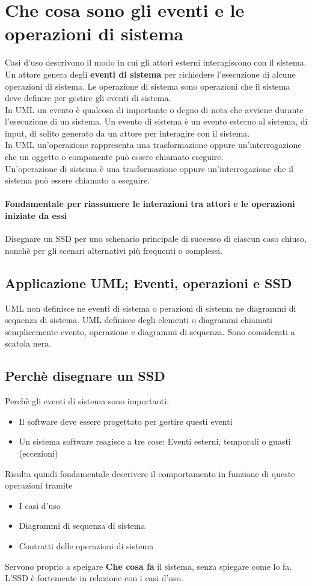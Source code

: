 \section{Che cosa sono gli eventi e le operazioni di sistema}
Casi d'uso descrivono il modo in cui gli attori esterni interagiscono con il sistema.
Un attore genera degli \textbf{eventi di sistema} per richiedere l'esecuzione di alcune
operazioni di sistema. Le operazione di sistema sono operazioni che il sistema
deve definire per gestire gli eventi di sistema.
\\ In UML un evento è qualcosa di importante o degno di nota che avviene durante l'esecuzione
di un sistema.
Un evento di sistema è un evento esterno al sistema, di input, di solito generato
da un attore per interagire con il sistema.
\\ In UML un'operazione rappresenta una trasformazione oppure un'interrogazione che
un oggetto o componente può essere chiamato eseguire.
\\ Un'operazione di sistema è una trasformazione oppure un'interrogazione che il sistema
può essere chiamato a eseguire.
\paragraph*{Fondamentale per riassumere le interazioni tra attori e le operazioni iniziate da essi}
Disegnare un SSD per uno schenario principale di successo di ciascun caso chiuso, nonchè per gli scenari
alternativi più frequenti o complessi.
\subsection*{Applicazione UML; Eventi, operazioni e SSD}
UML non definisce ne eventi di sistema o perazioni di sistema ne diagrammi di sequenza di sistema.
UML definisce degli elementi o diagrammi chiamati semplicemente evento, operazione e 
diagrammi di sequenza. Sono considerati a scatola nera.
\subsection*{Perchè disegnare un SSD}
Perchè gli eventi di sistema sono importanti:
\begin{itemize}
    \item Il software deve essere progettato per gestire questi eventi
    \item Un sistema software reagisce a tre cose: Eventi esterni, temporali o guasti (eccezioni)
\end{itemize}
Risulta quindi fondamentale descrivere il comportamento in funzione di queste operazioni tramite
\begin{itemize}
    \item I casi d'uso
    \item Diagrammi di sequenza di sistema
    \item Contratti delle operazioni di sistema
\end{itemize}
Servono proprio a speigare \textbf{Che cosa fa} il sistema, senza spiegare come lo fa.
L'SSD è fortemente in relazione con i casi d'uso.
